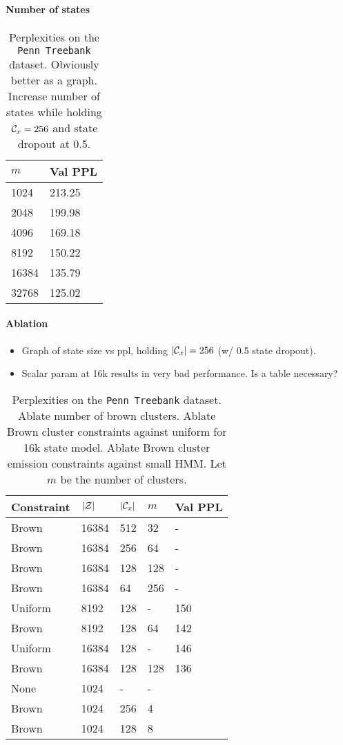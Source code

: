 \documentclass[11pt,a4paper]{article}
\begin{document}
\paragraph{Number of states}

\begin{table}[!t]
\centering
\caption{\label{tbl:states-ablation}
Perplexities on the \texttt{Penn Treebank} dataset.
Obviously better as a graph.
Increase number of states while holding $\mathcal{C}_x=256$
and state dropout at 0.5.
}
\begin{tabular}{ll}
\toprule
$m$ & Val PPL\\
\midrule
1024 & 213.25\\
2048 & 199.98\\
4096 & 169.18\\
8192 & 150.22\\
16384 & 135.79\\
32768 & 125.02\\
\bottomrule
\end{tabular}
\end{table}


\paragraph{Ablation}

\begin{itemize}
\item Graph of state size vs ppl, holding $|\mathcal{C}_x| = 256$ (w/ 0.5 state dropout).
\item Scalar param at 16k results in very bad performance. Is a table necessary?
\end{itemize}

\begin{table}[!t]
\centering
\caption{\label{tbl:constraint-ablation}
Perplexities on the \texttt{Penn Treebank} dataset.
Ablate number of brown clusters.
Ablate Brown cluster constraints against uniform for 16k state model.
Ablate Brown cluster emission constraints against small HMM.
Let $m$ be the number of clusters.
}
\begin{tabular}{lllll}
\toprule
Constraint & $|\mathcal{Z}|$ & $|\mathcal{C}_x|$ & $m$ & Val PPL\\
\midrule
Brown & 16384 & 512 & 32  & -\\
Brown & 16384 & 256 & 64  & -\\
Brown & 16384 & 128 & 128 & -\\
Brown & 16384 & 64  & 256 & -\\
\midrule
Uniform    & 8192    & 128    & -   & 150\\
Brown      & 8192    & 128    & 64  & 142\\
Uniform    & 16384   & 128    & -   & 146\\
Brown      & 16384   & 128    & 128 & 136\\
\midrule
None  & 1024 & - & - & \\
Brown & 1024 & 256 & 4 & \\
Brown & 1024 & 128 & 8 & \\
\bottomrule
\end{tabular}
\end{table}
\end{document}
